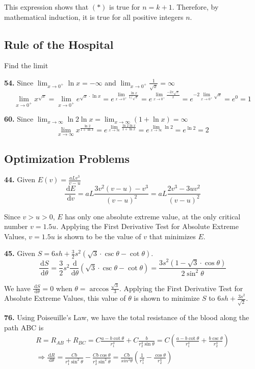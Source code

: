 \documentclass[a4paper,12pt]{article}
\newcommand{\ud}{\,\mathrm{d}}
\begin{document}
This expression shows that $(*)$ is true for $n = k + 1$. Therefore, by
mathematical induction, it is true for all positive integers $n$.

\subsection{Rule of the Hospital}
Find the limit

\noindent\textbf{54. }Since $\lim_{x \to 0^+}\ln x = -\infty$
and $\lim_{x \to 0^+}\frac{1}{\sqrt x} = \infty$
\[\lim_{x \to 0^+}x^{\sqrt x}
= \lim_{x \to 0^+}e^{\sqrt{x}\cdot\ln{x}}
= e^{\lim_{x \to 0^+}\frac{\ln x}{1/\sqrt x}}
= e^{\lim_{x \to 0^+}\frac{-2x\sqrt x}{x}}
= e^{-2\lim_{x \to 0^+}\sqrt x}
= e^0
= 1\]

\noindent\textbf{60. }Since
$\lim_{x \to \infty}\ln{2}\ln x = \lim_{x \to \infty}(1 + \ln x) = \infty$
\[\lim_{x \to \infty}x^\frac{\ln 2}{1 + \ln x}
= e^{\lim_{x \to \infty}\frac{\ln{2}\ln x}{1 + \ln x}}
= e^{\lim_{x \to \infty}\ln{2}}
= e^{\ln 2}
= 2\]

\setcounter{subsection}{6}
\subsection{Optimization Problems}
\textbf{44. }Given $E(v) = \frac{aLv^3}{v - u}$
\[\frac{\ud E}{\ud v}
= aL\frac{3v^2(v - u) - v^3}{(v - u)^2}
= aL\frac{2v^3 - 3uv^2}{(v - u)^2}\]

Since $v > u > 0$, $E$ has only one absolute extreme value, at the only
critical number $v = 1.5u$. Applying the First Derivative Test for Absolute
Extreme Values, $v = 1.5u$ is shown to be the value of $v$ that minimizes $E$.

\noindent\textbf{45. }Given
$S = 6sh + \frac{3}{2}s^2(\sqrt{3}\cdot\csc\theta - \cot\theta)$.
\[\frac{\ud S}{\ud\theta}
= \frac{3}{2}s^2\frac{\ud}{\ud\theta}(\sqrt{3}\cdot\csc\theta - \cot\theta)
= \frac{3s^2(1 - {\sqrt{3}\cdot\cos\theta})}{2\sin^2\theta}\]

We have $\frac{\ud S}{\ud\theta} = 0$ when $\theta = \arccos\frac{\sqrt 3}{3}$.
Applying the First Derivative Test for Absolute Extreme Values, this value of
$\theta$ is shown to minimize $S$ to $6sh + \frac{3s^2}{\sqrt 2}$.

\noindent\textbf{76. }Using Poiseuille's Law, we have the total resistance of
the blood along the path ABC is
\begin{multline*}
R = R_{AB} + R_{BC}
  = C\frac{a - b\cot\theta}{r_1^4} + C\frac{b}{r_2^4 \sin\theta}
  = C\left(\frac{a - b\cot\theta}{r_1^4} + \frac{b\csc\theta}{r_2^4}\right)\\
\Longrightarrow\frac{\ud R}{\ud\theta}
= \frac{Cb}{r_1^4 \sin^2\theta} - \frac{Cb\cos\theta}{r_2^4\sin^2\theta}
= \frac{Cb}{sin^2\theta}\left(\frac{1}{r_1^4} - \frac{\cos\theta}{r_2^4}\right)
\end{multline*}
\end{document}
